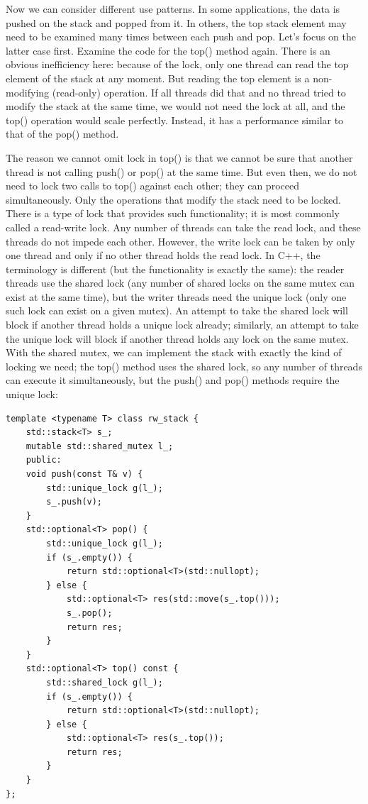 Now we can consider different use patterns. In some applications, the data is pushed on the stack and popped from it. In others, the top stack element may need to be examined many times between each push and pop. Let's focus on the latter case first. Examine the code for the top() method again. There is an obvious inefficiency here: because of the lock, only one thread can read the top element of the stack at any moment. But reading the top element is a non-modifying (read-only) operation. If all threads did that and no thread tried to modify the stack at the same time, we would not need the lock at all, and the top() operation would scale perfectly. Instead, it has a performance similar to that of the pop() method.

The reason we cannot omit lock in top() is that we cannot be sure that another thread is not calling push() or pop() at the same time. But even then, we do not need to lock two calls to top() against each other; they can proceed simultaneously. Only the operations that modify the stack need to be locked. There is a type of lock that provides such functionality; it is most commonly called a read-write lock. Any number of threads can take the read lock, and these threads do not impede each other. However, the write lock can be taken by only one thread and only if no other thread holds the read lock. In C++, the terminology is different (but the functionality is exactly the same): the reader threads use the shared lock (any number of shared locks on the same mutex can exist at the same time), but the writer threads need the unique lock (only one such lock can exist on a given mutex). An attempt to take the shared lock will block if another thread holds a unique lock already; similarly, an attempt to take the unique lock will block if another thread holds any lock on the same mutex. With the shared mutex, we can implement the stack with exactly the kind of locking we need; the top() method uses the shared lock, so any number of threads can execute it simultaneously, but the push() and pop() methods require the unique lock:

\begin{lstlisting}[style=styleCXX]
template <typename T> class rw_stack {
	std::stack<T> s_;
	mutable std::shared_mutex l_;
	public:
	void push(const T& v) {
		std::unique_lock g(l_);
		s_.push(v);
	}
	std::optional<T> pop() {
		std::unique_lock g(l_);
		if (s_.empty()) {
			return std::optional<T>(std::nullopt);
		} else {
			std::optional<T> res(std::move(s_.top()));
			s_.pop();
			return res;
		}
	}
	std::optional<T> top() const {
		std::shared_lock g(l_);
		if (s_.empty()) {
			return std::optional<T>(std::nullopt);
		} else {
			std::optional<T> res(s_.top());
			return res;
		}
	}
};
\end{lstlisting}


